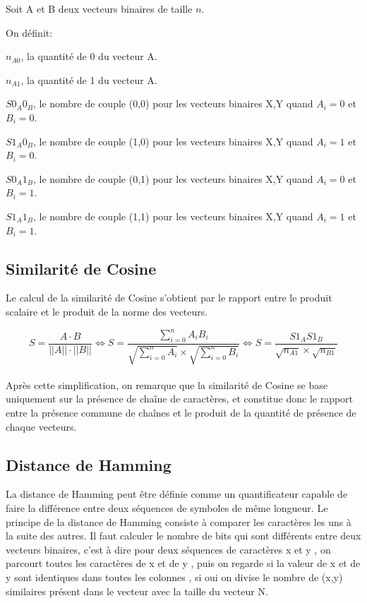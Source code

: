 \documentclass[11pt]{article}
\begin{document}
Soit A et B deux vecteurs binaires de taille $n$.

On définit:

   $n_{A0}$, la quantité de 0 du vecteur A.
   
   $n_{A1}$, la quantité de 1 du vecteur A.
    
   $S0_{A}0_{B}$, le nombre de couple (0,0) pour les vecteurs binaires X,Y quand $A_{i} = 0$ et $B_{i} = 0$.

   $S1_{A}0_{B}$, le nombre de couple (1,0) pour les vecteurs binaires X,Y quand $A_{i} = 1$ et $B_{i} = 0$.

   $S0_{A}1_{B}$, le nombre de couple (0,1) pour les vecteurs binaires X,Y quand $A_{i} = 0$ et $B_{i} = 1$.

   $S1_{A}1_{B}$, le nombre de couple (1,1) pour les vecteurs binaires X,Y quand $A_{i} = 1$ et $B_{i} = 1$.\\
   


\subsection{Similarité de Cosine}
Le calcul de la similarité de Cosine s'obtient par le rapport entre le produit scalaire et le produit de la norme des vecteurs.

\[
    S = \frac{A \cdot B}{||A|| \cdot ||B||}
    \Leftrightarrow S = \frac{\sum_{i=0}^n A_{i}B_{i}}{\sqrt{\sum_{i=0}^n A_{i}}\times\sqrt{\sum_{i=0}^n B_{i}}}
    \Leftrightarrow S = \frac{S1_{A}S1_{B}}{\sqrt{n_{A1}}\times \sqrt{n_{B1}}}
\]\\
Après cette simplification, on remarque que la similarité de Cosine se base uniquement sur la présence de chaîne de caractères, et constitue donc le rapport entre la présence commune de chaînes et le produit de la quantité de présence de chaque vecteurs.
\subsection{Distance de Hamming}
La distance de Hamming peut être définie comme un quantificateur capable de faire la différence entre deux séquences de symboles de même longueur.
Le principe de la distance de Hamming consiste à comparer les caractères les uns à la suite des autres.
Il faut calculer le nombre de bits qui sont différents entre deux vecteurs binaires, c’est à dire pour deux séquences de caractères x et y , on parcourt toutes les caractères de x et de y , puis on regarde si la valeur de x et de y sont identiques dans toutes les colonnes , si oui on divise le nombre de (x,y) similaires présent dans le vecteur avec la taille du vecteur N. 
\end{document}
